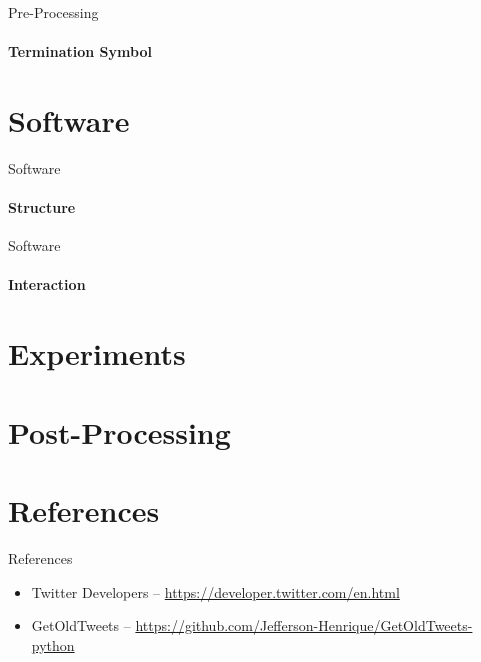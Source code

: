 \documentclass{beamer}
\begin{document}
\begin{frame}{Pre-Processing}
\framesubtitle{Termination Symbol}
\end{frame}

\section{Software}

\begin{frame}{Software}
\framesubtitle{Structure}
\end{frame}

\begin{frame}{Software}
\framesubtitle{Interaction}
\end{frame}

\section{Experiments}

\section{Post-Processing}

\section{References}

\begin{frame}{References}
\begin{small}
\begin{itemize}
\item Twitter Developers -- \url{https://developer.twitter.com/en.html}
\item GetOldTweets -- \url{https://github.com/Jefferson-Henrique/GetOldTweets-python}
\end{itemize}
\end{small}
\end{frame}
\end{document}
